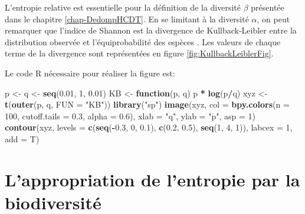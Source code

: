 \documentclass[
  11pt,
  french,
  a4paper,
  extrafontsizes,onecolumn,openright
  ]{memoir}
\newenvironment{Shaded}{\begin{snugshade}}{\end{snugshade}}
\newcommand{\ControlFlowTok}[1]{\textcolor[rgb]{0.13,0.29,0.53}{\textbf{#1}}}
\newcommand{\DataTypeTok}[1]{\textcolor[rgb]{0.13,0.29,0.53}{#1}}
\newcommand{\DecValTok}[1]{\textcolor[rgb]{0.00,0.00,0.81}{#1}}
\newcommand{\FloatTok}[1]{\textcolor[rgb]{0.00,0.00,0.81}{#1}}
\newcommand{\KeywordTok}[1]{\textcolor[rgb]{0.13,0.29,0.53}{\textbf{#1}}}
\newcommand{\NormalTok}[1]{#1}
\newcommand{\OperatorTok}[1]{\textcolor[rgb]{0.81,0.36,0.00}{\textbf{#1}}}
\newcommand{\StringTok}[1]{\textcolor[rgb]{0.31,0.60,0.02}{#1}}
\begin{document}
\normalsize

L'entropie relative est essentielle pour la définition de la diversité \(\beta\) présentée dans le chapitre \ref{chap-DedompHCDT}.
En se limitant à la diversité \(\alpha\), on peut remarquer que l'indice de Shannon est la divergence de Kullback-Leibler entre la distribution observée et l'équiprobabilité des espèces \autocite{Marcon2012a}.
Les valeurs de chaque terme de la divergence sont représentées en figure \ref{fig:KullbackLeiblerFig}.

Le code R nécessaire pour réaliser la figure est:

\scriptsize

\begin{Shaded}
\begin{Highlighting}[]
\NormalTok{p <-}\StringTok{ }\NormalTok{q <-}\StringTok{ }\KeywordTok{seq}\NormalTok{(}\FloatTok{0.01}\NormalTok{, }\DecValTok{1}\NormalTok{, }\FloatTok{0.01}\NormalTok{)}
\NormalTok{KB <-}\StringTok{ }\ControlFlowTok{function}\NormalTok{(p, q) p }\OperatorTok{*}\StringTok{ }\KeywordTok{log}\NormalTok{(p}\OperatorTok{/}\NormalTok{q)}
\NormalTok{xyz <-}\StringTok{ }\KeywordTok{t}\NormalTok{(}\KeywordTok{outer}\NormalTok{(p, q, }\DataTypeTok{FUN =} \StringTok{"KB"}\NormalTok{))}
\KeywordTok{library}\NormalTok{(}\StringTok{"sp"}\NormalTok{)}
\KeywordTok{image}\NormalTok{(xyz, }\DataTypeTok{col =} \KeywordTok{bpy.colors}\NormalTok{(}\DataTypeTok{n =} \DecValTok{100}\NormalTok{, }\DataTypeTok{cutoff.tails =} \FloatTok{0.3}\NormalTok{, }\DataTypeTok{alpha =} \FloatTok{0.6}\NormalTok{),}
    \DataTypeTok{xlab =} \StringTok{"q"}\NormalTok{, }\DataTypeTok{ylab =} \StringTok{"p"}\NormalTok{, }\DataTypeTok{asp =} \DecValTok{1}\NormalTok{)}
\KeywordTok{contour}\NormalTok{(xyz, }\DataTypeTok{levels =} \KeywordTok{c}\NormalTok{(}\KeywordTok{seq}\NormalTok{(}\OperatorTok{-}\FloatTok{0.3}\NormalTok{, }\DecValTok{0}\NormalTok{, }\FloatTok{0.1}\NormalTok{), }\KeywordTok{c}\NormalTok{(}\FloatTok{0.2}\NormalTok{, }\FloatTok{0.5}\NormalTok{), }\KeywordTok{seq}\NormalTok{(}\DecValTok{1}\NormalTok{,}
    \DecValTok{4}\NormalTok{, }\DecValTok{1}\NormalTok{)), }\DataTypeTok{labcex =} \DecValTok{1}\NormalTok{, }\DataTypeTok{add =}\NormalTok{ T)}
\end{Highlighting}
\end{Shaded}

\normalsize

\hypertarget{lappropriation-de-lentropie-par-la-biodiversituxe9}{%
\section{L'appropriation de l'entropie par la biodiversité}\label{lappropriation-de-lentropie-par-la-biodiversituxe9}}
\end{document}

